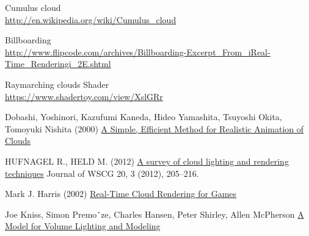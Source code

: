 Cumulus cloud \\
\underline{http://en.wikipedia.org/wiki/Cumulus\_cloud}

Billboarding \\
{\footnotesize \underline{http://www.flipcode.com/archives/Billboarding-Excerpt\_From\_iReal-Time\_Renderingi\_2E.shtml}}

Raymarching clouds Shader \\
\underline{https://www.shadertoy.com/view/XslGRr}


Dobashi, Yoshinori, Kazufumi Kaneda, Hideo Yamashita, Tsuyoshi Okita, Tomoyuki Nishita (2000) \underline{A Simple, Efficient Method for Realistic Animation of Clouds}

HUFNAGEL R., HELD M. (2012) \underline{A survey of cloud lighting and rendering techniques} Journal of WSCG 20, 3 (2012), 205–216.

Mark J. Harris (2002) \underline{Real-Time Cloud Rendering for Games}

Joe Kniss, Simon Premoˇze, Charles Hansen, Peter Shirley, Allen McPherson \underline{A Model for Volume Lighting and Modeling}